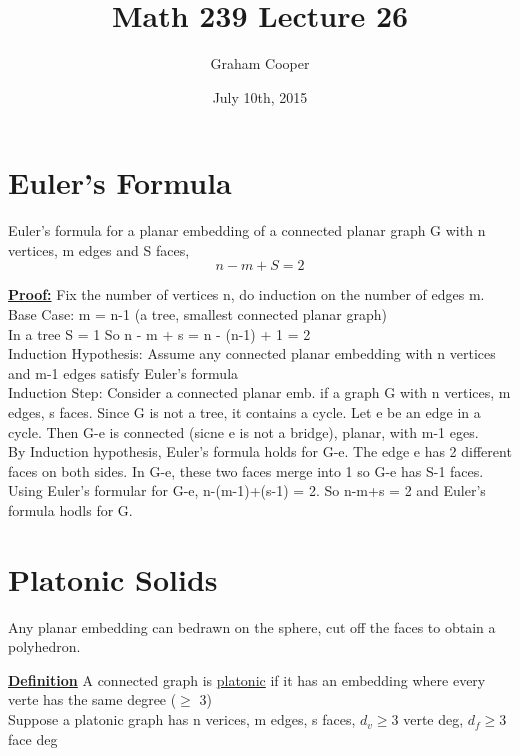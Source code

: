 \documentclass[12pt]{article}
\title{\vspace{-15ex}Math 239 Lecture 26\vspace{-1ex}}
\date{July 10th, 2015}
\author{Graham Cooper}
\newcommand{\myt}[1]{\textbf{\underline{#1}}}
\begin{document}
	\maketitle
	
	\section*{Euler's Formula}
	
	Euler's formula for a planar embedding of a connected planar graph G with n vertices, m edges and S faces,\\
	$$n - m + S = 2$$
	
	\myt{Proof:} Fix the number of vertices n, do induction on the number of edges m.\\
	
	Base Case: m = n-1 (a tree, smallest connected planar graph)\\
	In a tree S = 1 So n - m + s = n - (n-1) + 1 = 2\\
	
	Induction Hypothesis: Assume any connected planar embedding with n vertices and m-1 edges satisfy Euler's formula\\
	
	Induction Step: Consider a connected planar emb. if a graph G with n vertices, m edges, s faces. Since G is not a tree, it contains a cycle. Let e be an edge in a cycle. Then G-e is connected (sicne e is not a bridge), planar, with m-1 eges.\\
	By Induction hypothesis, Euler's formula holds for G-e. The edge e has 2 different faces on both sides. In G-e, these two faces merge into 1 so G-e has S-1 faces. Using Euler's formular for G-e, n-(m-1)+(s-1) = 2. So n-m+s = 2 and Euler's formula hodls for G.\\
	
	\section*{Platonic Solids}
	Any planar embedding can bedrawn on the sphere, cut off the faces to obtain a polyhedron.
	
	\myt{Definition} A connected graph is \underline{platonic} if it has an embedding where every verte has the same degree ($\geq$ 3)\\
	
	Suppose a platonic graph has n verices, m edges, s faces, $d_v \geq 3$ verte deg, $d_f \geq 3$ face deg\\
	
\end{document}
